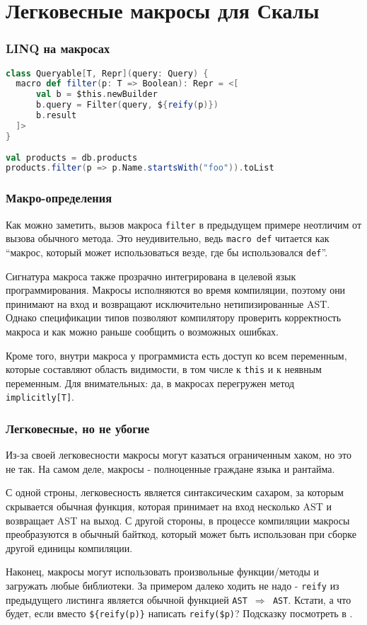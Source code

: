 \documentclass[hyperref={bookmarks=false}]{beamer}
\begin{document}
\section{Легковесные макросы для Скалы}

\begin{frame}[t, fragile]
\frametitle{LINQ на макросах}

\begin{lstlisting}[language=scala]
class Queryable[T, Repr](query: Query) { 
  macro def filter(p: T => Boolean): Repr = <[  
      val b = $this.newBuilder  
      b.query = Filter(query, ${reify(p)})  
      b.result  
  ]> 
} 
 
val products = db.products 
products.filter(p => p.Name.startsWith("foo")).toList 
\end{lstlisting}
\end{frame}

\begin{frame}[t]
\frametitle{Макро-определения}

Как можно заметить, вызов макроса \texttt{filter} в предыдущем примере неотличим от вызова обычного метода. Это неудивительно, ведь \texttt{macro def} читается как ``макрос, который может использоваться везде, где бы использовался \texttt{def}''.

Сигнатура макроса также прозрачно интегрирована в целевой язык программирования. Макросы исполняются во время компиляции, поэтому они принимают на вход и возвращают исключительно нетипизированные AST. Однако спецификации типов позволяют компилятору проверить корректность макроса и как можно раньше сообщить о возможных ошибках.

Кроме того, внутри макроса у программиста есть доступ ко всем переменным, которые составляют область видимости, в том числе к \texttt{this} и к неявным переменным. Для внимательных: да, в макросах перегружен метод \texttt{implicitly[T]}.
\end{frame}

\begin{frame}[t]
\frametitle{Легковесные, но не убогие}

Из-за своей легковесности макросы могут казаться ограниченным хаком, но это не так. На самом деле, макросы - полноценные граждане языка и рантайма.

С одной строны, легковесность является синтаксическим сахаром, за которым скрывается обычная функция, которая принимает на вход несколько AST и возвращает AST на выход. С другой стороны, в процессе компиляции макросы преобразуются в обычный байткод, который может быть использован при сборке другой единицы компиляции.

Наконец, макросы могут использовать произвольные функции/методы и загружать любые библиотеки. За примером далеко ходить не надо - \texttt{reify} из предыдущего листинга является обычной функцией \texttt{AST $\Rightarrow$ AST}. Кстати, а что будет, если вместо \texttt{\$\{reify(p)\}} написать \texttt{reify(\$p)}? Подсказку посмотреть в .
\end{frame}
\end{document}
